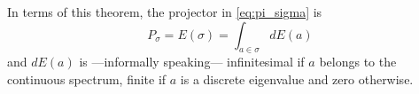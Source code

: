 In terms of this theorem, the projector in \eqref{eq:pi_sigma} is
\begin{equation}\label{eq:P_sigma_spectral}
  P_{\sigma} = E(\sigma) = \int_{a\in\sigma}dE(a)
\end{equation}
and $dE(a)$ is
---informally speaking---
infinitesimal if $a$ belongs to the continuous spectrum,
finite if $a$ is a discrete eigenvalue
and zero otherwise.
